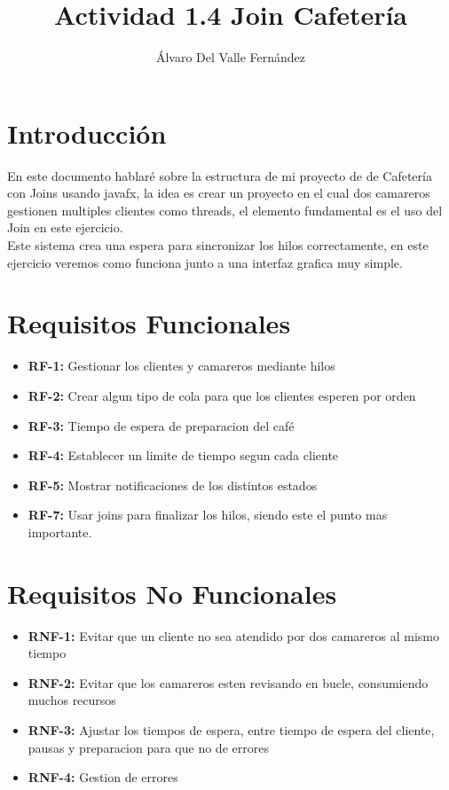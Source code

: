 \documentclass{article}
\title{Actividad 1.4 Join Cafetería}
\author{Álvaro Del Valle Fernández}
\begin{document}
\maketitle

\section{Introducción}
En este documento hablaré sobre la estructura de mi proyecto de de Cafetería con Joins usando javafx, la idea es crear un proyecto en el cual dos camareros gestionen multiples clientes como threads, el elemento fundamental es el uso del Join en este ejercicio.\\
    Este sistema crea una espera para sincronizar los hilos correctamente, en este ejercicio veremos como funciona junto a una interfaz grafica muy simple.
\section{Requisitos Funcionales}
\begin{itemize}
    \item \textbf{RF-1:} Gestionar los clientes y camareros mediante hilos
    \item \textbf{RF-2:} Crear algun tipo de cola para que los clientes esperen por orden
    \item \textbf{RF-3:} Tiempo de espera de preparacion del café
    \item \textbf{RF-4:} Establecer un limite de tiempo segun cada cliente
    \item \textbf{RF-5:} Mostrar notificaciones de los distintos estados
    \item \textbf{RF-7:} Usar joins para finalizar los hilos, siendo este el punto mas importante.
\end{itemize}

\section{Requisitos No Funcionales}
\begin{itemize}
    \item \textbf{RNF-1:} Evitar que un cliente no sea atendido por dos camareros al mismo tiempo
    \item \textbf{RNF-2:} Evitar que los camareros esten revisando en bucle, consumiendo muchos recursos
    \item \textbf{RNF-3:} Ajustar los tiempos de espera, entre tiempo de espera del cliente, pausas y preparacion para que no de errores
    \item \textbf{RNF-4:} Gestion de errores
\end{itemize}
\end{document}
